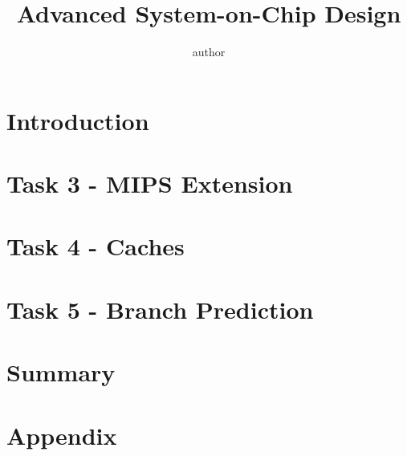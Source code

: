 \documentclass[11pt,a4paper]{article}
\title{Advanced System-on-Chip Design}
\author{author}
\begin{document}


\tableofcontents
\newpage
\listoffigures
\newpage
\listoftables
\newpage
\lstlistoflistings

\newpage
\section{Introduction}


\newpage
\section{Task 3 - MIPS Extension}


\newpage
\section{Task 4 - Caches}


\newpage
\section{Task 5 - Branch Prediction}


\newpage
\section{Summary}


\newpage
\section{Appendix}



\newpage
\nocite{*}
\printbibliography

\end{document}
